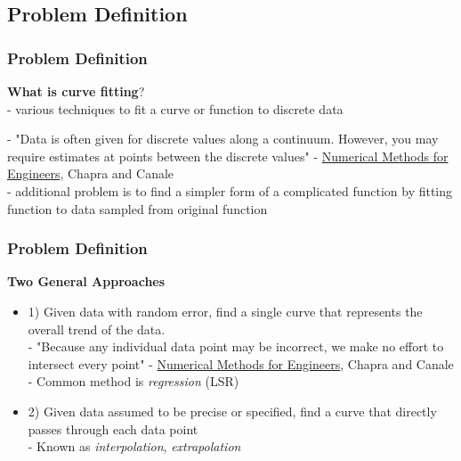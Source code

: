 \documentclass[fleqn]{beamer} %
\newcommand{\sectionIsubsectionItitle}{Problem Definition}
\begin{document}
		\subsection{\sectionIsubsectionItitle}\label{sectionIsubsectionI}

			\begin{frame}
				\frametitle{\sectionIsubsectionItitle}
				\bigskip
  
        \textbf{\small What is curve fitting}?
        \vspace{2mm}\\
        
        - various techniques to fit a curve or function to discrete data \vspace{5mm}
 
        - "Data is often given for discrete values along a continuum. However, you may require
estimates at points between the discrete values" - \underline{ Numerical Methods for Engineers}, Chapra and Canale \vspace{5mm}\\ 			
        - additional problem is to find a simpler form of a complicated function by fitting function to data sampled from original function
	
				\btVFill
			\end{frame}

			\begin{frame}
				\frametitle{\sectionIsubsectionItitle} \footnotesize
				\bigskip

        \textbf{\small Two General Approaches}
        \vspace{2mm}
        \begin{itemize}
          \item 1) Given data with random error, find a single curve that represents the overall trend of the data. \vspace{2mm}\\ 
          -  "Because any individual data point may be incorrect, we make no effort to intersect every point" - \underline{ Numerical Methods for Engineers}, Chapra and Canale \vspace{1mm}\\
          - Common method is {\it regression} (LSR) \vspace{3mm}\\
        \item 2) Given data assumed to be precise or specified, find a curve that directly passes through each data point \vspace{1mm}\\
          - Known as {\it interpolation}, {\it extrapolation} 
			  \end{itemize}	
				\btVFill
			\end{frame}
\end{document}
